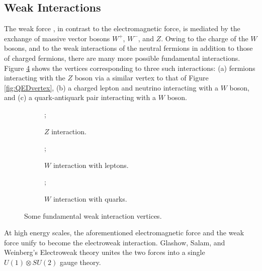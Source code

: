 \subsection{Weak Interactions}
The weak force \cite{pdg_rev,glashow,goldstone_weinberg_salam,weinberg}, in contrast to the electromagnetic force, is mediated by the exchange of massive vector bosons $W^+$, $W^-$, and $Z$. Owing to the charge of the $W$ bosons, and to the weak interactions of the neutral fermions in addition to those of charged fermions, there are many more possible fundamental interactions. Figure \ref{fig:EWVertices} shows the vertices corresponding to three such interactions: (a) fermions interacting with the $Z$ boson via a similar vertex to that of Figure \ref{fig:QEDvertex}, (b) a charged lepton and neutrino interacting with a $W$ boson, and (c) a quark-antiquark pair interacting with a $W$ boson.

\begin{figure}[h!]
    \begin{subfigure}{.5\textwidth}
        \centering
        ;
        \caption{$Z$ interaction.}
        \label{fig:EWvertexa}
    \end{subfigure}
    \begin{subfigure}{.5\textwidth}
        \centering
        ;
        \caption{$W$ interaction with leptons.}
        \label{fig:EWVertexb}
    \end{subfigure}
    \newline
    \begin{subfigure}{1\textwidth}
        \centering
        ;
        \caption{$W$ interaction with quarks.}
        \label{fig:EWVertexc}
    \end{subfigure}
    \caption{Some fundamental weak interaction vertices.}
    \label{fig:EWVertices}
\end{figure}

At high energy scales, the aforementioned electromagnetic force and the weak force unify to become the electroweak interaction. Glashow, Salam, and Weinberg's Electroweak theory unites the two forces into a single $U(1) \otimes SU(2)$ gauge theory.

